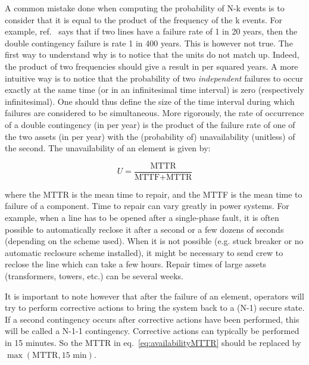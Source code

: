 
A common mistake done when computing the probability of N-k events is to consider that it is equal to the product of the frequency of the k events. For example, ref.~\cite{CIGREreviewOfTools} says that if two lines have a failure rate of 1 in 20 years, then the double contingency failure is rate 1 in 400 years. This is however not true. The first way to understand why is to notice that the units do not match up. Indeed, the product of two frequencies should give a result in per squared years. A more intuitive way is to notice that the probability of two \textit{independent} failures to occur exactly at the same time (or in an infinitesimal time interval) is zero (respectively infinitesimal). One should thus define the size of the time interval during which failures are considered to be simultaneous. More rigorously, the rate of occurrence of a double contingency (in per year) is the product of the failure rate of one of the two assets (in per year) with the (probability of) unavailability (unitless) of the second. The unavailability of an element is given by:

\begin{equation}
\label{eq:availabilityMTTR}
    U = \frac{\text{MTTR}}{\text{MTTF} + \text{MTTR}}
\end{equation}


where the MTTR is the mean time to repair, and the MTTF is the mean time to failure of a component. Time to repair can vary greatly in power systems. For example, when a line has to be opened after a single-phase fault, it is often possible to automatically reclose it after a second or a few dozens of seconds (depending on the scheme used). When it is not possible (e.g. stuck breaker or no automatic reclosure scheme installed), it might be necessary to send crew to reclose the line which can take a few hours. Repair times of large assets (transformers, towers, etc.) can be several weeks.

It is important to note however that after the failure of an element, operators will try to perform corrective actions to bring the system back to a (N-1) secure state. If a second contingency occurs after corrective actions have been performed, this will be called a N-1-1 contingency. Corrective actions can typically be performed in 15 minutes. So the MTTR in eq.~\ref{eq:availabilityMTTR} should be replaced by \(\max(\text{MTTR}, 15\text{~min})\).

